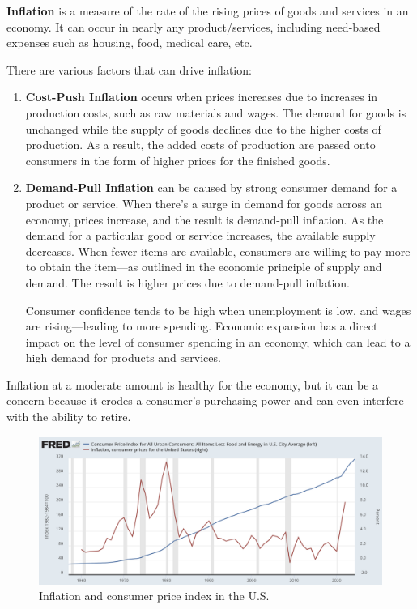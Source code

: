\documentclass{article}
\begin{document}
  \begin{definition}[Inflation]
    \textbf{Inflation} is a measure of the rate of the rising prices of goods and services in an economy. It can occur in nearly any product/services, including need-based expenses such as housing, food, medical care, etc. 

    There are various factors that can drive inflation: 
    \begin{enumerate}
      \item \textbf{Cost-Push Inflation} occurs when prices increases due to increases in production costs, such as raw materials and wages. The demand for goods is unchanged while the supply of goods declines due to the higher costs of production. As a result, the added costs of production are passed onto consumers in the form of higher prices for the finished goods. 
      \item \textbf{Demand-Pull Inflation} can be caused by strong consumer demand for a product or service. When there's a surge in demand for goods across an economy, prices increase, and the result is demand-pull inflation. As the demand for a particular good or service increases, the available supply decreases. When fewer items are available, consumers are willing to pay more to obtain the item—as outlined in the economic principle of supply and demand. The result is higher prices due to demand-pull inflation.
      
      Consumer confidence tends to be high when unemployment is low, and wages are rising—leading to more spending. Economic expansion has a direct impact on the level of consumer spending in an economy, which can lead to a high demand for products and services.
    \end{enumerate}

    Inflation at a moderate amount is healthy for the economy, but it can be a concern because it erodes a consumer's purchasing power and can even interfere with the ability to retire. 
  \end{definition}

  \begin{figure}[H]
    \centering 
    \includegraphics[scale=0.4]{img/inflation_cpi.png}
    \caption{Inflation and consumer price index in the U.S.} 
    \label{fig:inflation_cpi}
  \end{figure}
\end{document}

